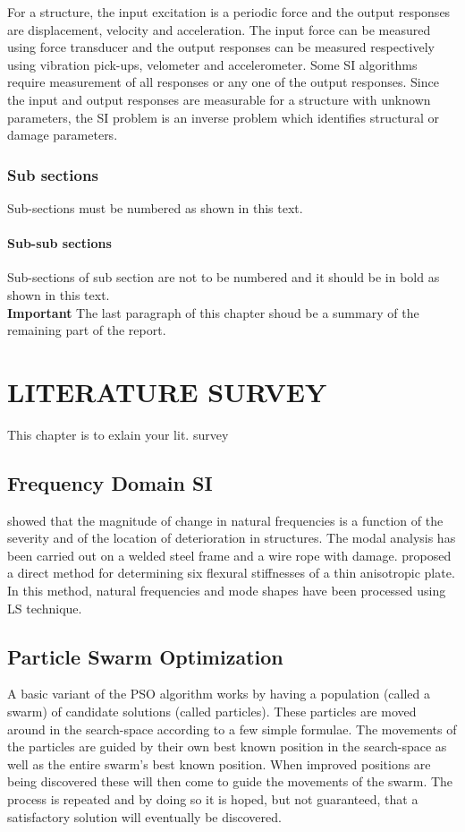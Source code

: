 \documentclass[BTech]{ugthesis}
\begin{document}
  For a structure, the input excitation is a periodic force and the output responses are displacement, velocity and acceleration. The input force can be measured using force transducer and the output responses can be measured respectively using vibration pick-ups, velometer and accelerometer. Some \ac{SI} algorithms require measurement of all responses or any one of the output responses. Since the input and output responses are measurable for a structure with unknown parameters, the \ac{SI} problem is an inverse problem which identifies structural or damage parameters.\\ \vspace{-5mm}
  \subsection{Sub sections} 
  Sub-sections must be numbered as shown in this text. 
  \subsubsection{Sub-sub sections}
  Sub-sections of sub section are not to be numbered and it should be in bold as shown in this text. \\
\textbf{Important}
The last paragraph of this chapter shoud be a summary of the remaining part of the report.

\chapter{LITERATURE SURVEY}

This chapter is to exlain your lit. survey
\section{Frequency Domain SI}
\citet{george} showed that the magnitude of change in natural frequencies is a function of the severity and of the location of deterioration in structures. The modal analysis has been carried out on a welded steel frame and a wire rope with damage. \citet{gredia} proposed a direct method for determining six flexural stiffnesses of a thin anisotropic plate. In this method, natural frequencies \citep{Leo} and mode shapes have been processed using \ac{LS} technique.
\section{Particle Swarm Optimization}
A basic variant of the \ac{PSO} \citep{kenndy} algorithm works by having a population (called a swarm) of candidate solutions (called particles). These particles are moved around in the search-space according to a few simple formulae. The movements of the particles are guided by their own best known position in the search-space as well as the entire swarm's best known position. When improved positions are being discovered these will then come to guide the movements of the swarm. The process is repeated and by doing so it is hoped, but not guaranteed, that a satisfactory solution will eventually be discovered.
\end{document}
